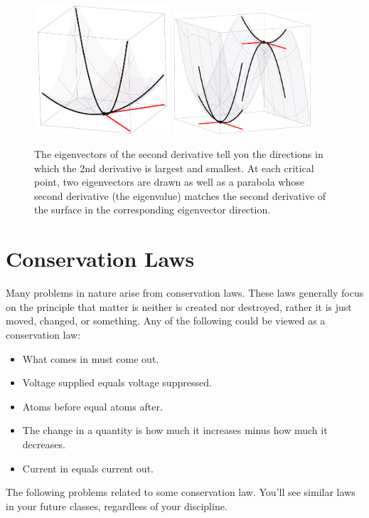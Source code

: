 \begin{figure}[ht
]\begin{center}
\includegraphics[width=2in]{support/2nddertest1}
\hspace{.5in}
\includegraphics[width=2in]{support/2nddertest2}
\end{center}
\caption{The eigenvectors of the second derivative tell you the directions in which the 2nd derivative is largest and smallest. At each critical point, two eigenvectors are drawn as well as a parabola whose second derivative (the eigenvalue) matches the second derivative of the surface in the corresponding eigenvector direction.}
\label{2ndder}
\end{figure}


\section{Conservation Laws}
Many problems in nature arise from conservation laws.  These laws generally focus on the principle that matter is neither is created nor destroyed, rather it is just moved, changed, or something.  Any of the following could be viewed as a conservation law:
\begin{itemize}
 \item What comes in must come out.
 \item Voltage supplied equals voltage suppressed.
 \item Atoms before equal atoms after.
 \item The change in a quantity is how much it increases minus how much it decreases.
 \item Current in equals current out.
\end{itemize}
The following problems related to some conservation law.  You'll see similar laws in your future classes, regardless of your discipline.


